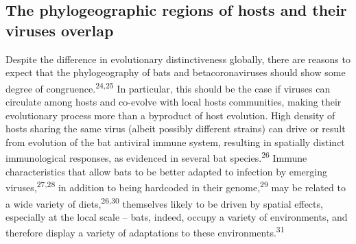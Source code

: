 \documentclass[10pt,oneside]{article}
\begin{document}
\hypertarget{the-phylogeographic-regions-of-hosts-and-their-viruses-overlap}{%
\subsection{The phylogeographic regions of hosts and their viruses
overlap}\label{the-phylogeographic-regions-of-hosts-and-their-viruses-overlap}}

Despite the difference in evolutionary distinctiveness globally, there
are reasons to expect that the phylogeography of bats and
betacoronaviruses should show some degree of
congruence.\textsuperscript{24,25} In particular, this should be the
case if viruses can circulate among hosts and co-evolve with local hosts
communities, making their evolutionary process more than a byproduct of
host evolution. High density of hosts sharing the same virus (albeit
possibly different strains) can drive or result from evolution of the
bat antiviral immune system, resulting in spatially distinct
immunological responses, as evidenced in several bat
species.\textsuperscript{26} Immune characteristics that allow bats to
be better adapted to infection by emerging
viruses,\textsuperscript{27,28} in addition to being hardcoded in their
genome,\textsuperscript{29} may be related to a wide variety of
diets,\textsuperscript{26,30} themselves likely to be driven by spatial
effects, especially at the local scale -- bats, indeed, occupy a variety
of environments, and therefore display a variety of adaptations to these
environments.\textsuperscript{31}
\end{document}
